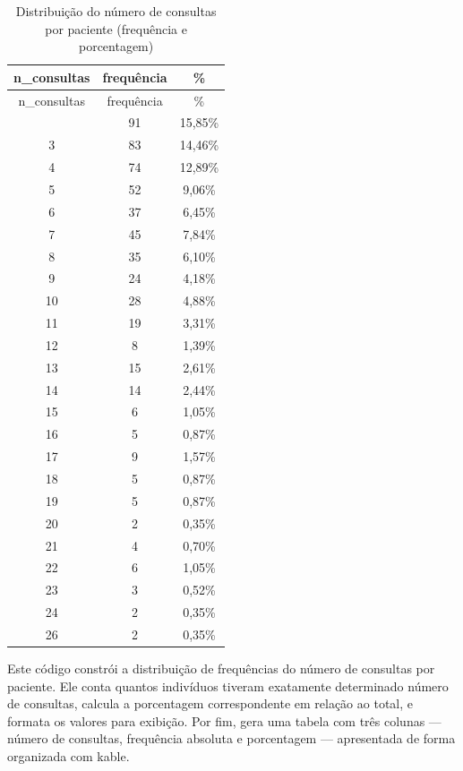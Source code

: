 \documentclass[
]{article}
\begin{document}
\begin{longtable}[]{@{}ccc@{}}
\caption{Distribuição do número de consultas por paciente (frequência e
porcentagem)}\tabularnewline
\toprule\noalign{}
n\_consultas & frequência & \% \\
\midrule\noalign{}
\endfirsthead
\toprule\noalign{}
n\_consultas & frequência & \% \\
\midrule\noalign{}
\endhead
\bottomrule\noalign{}
\endlastfoot
2 & 91 & 15,85\% \\
3 & 83 & 14,46\% \\
4 & 74 & 12,89\% \\
5 & 52 & 9,06\% \\
6 & 37 & 6,45\% \\
7 & 45 & 7,84\% \\
8 & 35 & 6,10\% \\
9 & 24 & 4,18\% \\
10 & 28 & 4,88\% \\
11 & 19 & 3,31\% \\
12 & 8 & 1,39\% \\
13 & 15 & 2,61\% \\
14 & 14 & 2,44\% \\
15 & 6 & 1,05\% \\
16 & 5 & 0,87\% \\
17 & 9 & 1,57\% \\
18 & 5 & 0,87\% \\
19 & 5 & 0,87\% \\
20 & 2 & 0,35\% \\
21 & 4 & 0,70\% \\
22 & 6 & 1,05\% \\
23 & 3 & 0,52\% \\
24 & 2 & 0,35\% \\
26 & 2 & 0,35\% \\
\end{longtable}

Este código constrói a distribuição de frequências do número de
consultas por paciente. Ele conta quantos indivíduos tiveram exatamente
determinado número de consultas, calcula a porcentagem correspondente em
relação ao total, e formata os valores para exibição. Por fim, gera uma
tabela com três colunas --- número de consultas, frequência absoluta e
porcentagem --- apresentada de forma organizada com kable.
\end{document}
